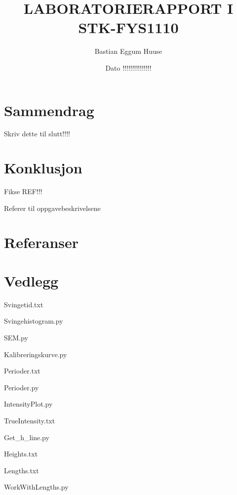 \documentclass{article}
\title{LABORATORIERAPPORT I STK-FYS1110}
\author{Bastian Eggum Huuse}
\date{Dato !!!!!!!!!!!!!!!}
\begin{document}
\maketitle

\newpage

\section*{Sammendrag}

Skriv dette til slutt!!!!

\newpage

\tableofcontents

\newpage



\newpage



\newpage



\newpage



\newpage

\section{Konklusjon}

Fikse REF!!!

Referer til oppgavebeskrivelsene

\newpage

\section{Referanser}

\newpage

\section{Vedlegg} \label{Vedlegg}

Svingetid.txt
\label{Svingetid.txt}

Svingehistogram.py \label{Svingehistogram.py}

SEM.py \label{SEM.py}

Kalibreringskurve.py \label{Kalibreringskurve.py}

Perioder.txt
\label{Perioder.txt}

Perioder.py
\label{Perioder.py}

IntensityPlot.py
\label{IntensityPlot.py}

TrueIntensity.txt
\label{TrueIntensity.txt}

Get\_h\_line.py
\label{Get_h_line.py}

Heights.txt
\label{Heights.txt}

Lengths.txt
\label{Lengths.txt}

WorkWithLengths.py
\label{WorkWithLengths.py}
\end{document}
